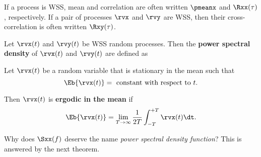 If a process is WSS, mean and correlation are often written
$\pmeanx$ and $\Rxx(\tau)$, respectively.
If a pair of processes $\rvx$ and $\rvy$ are WSS,
then their cross-correlation is often written $\Rxy(\tau)$.

\begin{definition}
Let $\rvx(t)$ and $\rvy(t)$ be WSS random processes.
Then the \textbf{power spectral density} of $\rvx(t)$ and $\rvy(t)$ are defined as
\end{definition}


\begin{definition}
Let $\rvx(t)$ be a random variable that is stationary in the mean such that
\[ \Eb{\rvx(t)} = \mbox{ constant with respect to } t.\]

Then $\rvx(t)$ is \textbf{ergodic in the mean} if
\[ \Eb{\rvx(t)} = \lim_{T\to\infty}\frac{1}{2T}\int_{-T}^{+T}\rvx(t)\dt.\]
\end{definition}

Why does $\Sxx(f)$ deserve the name {\em power spectral density function}?
This is answered by the next theorem.

